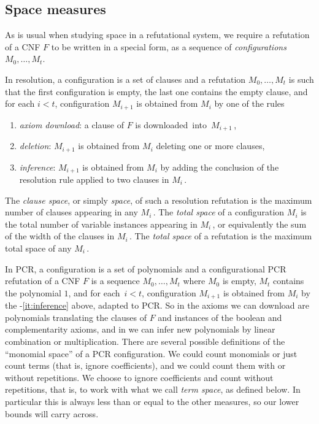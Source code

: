 \documentclass{toc}
\begin{document}
\subsection{Space measures} \label{sec:space_intro}
As is usual when studying space in a refutational system, we require a  refutation of a CNF $F$  to be 
written in a special form, as 
a sequence of \emph{configurations}  $M_0, \dots, M_t$. 

In resolution, a configuration is a set of clauses and a refutation  $M_0, \dots, M_t$ is such that the first configuration is empty, the last one contains the empty clause,
 and for each $i<t$, configuration 
 $M_{i+1}$ is obtained from $M_{i}$ by one of the rules
\begin{enumerate}[(1)]
\item\label{it:axiom-download}
\emph{axiom download}: a clause of $F$  is downloaded~into~$M_{i+1}$\,,
\item
\emph{deletion}: $M_{i+1}$ is obtained from $M_i$ deleting one or more clauses, 
\item\label{it:inference}
\emph{inference}:  $M_{i+1}$ is obtained from $M_i$ by adding the conclusion of  the  resolution rule applied to two clauses in $M_i$\,.
\end{enumerate}

\begin{definition}
The \emph{clause space}, or simply \emph{space}, of such a resolution refutation
is the maximum number of clauses appearing in any $M_i$\,.
The \emph{total space} of a configuration $M_i$ is the total number of variable instances appearing in $M_i$\,,
or equivalently the sum of the width of the clauses in $M_i$\,. The \emph{total space} of a refutation 
is the maximum total space of any $M_i$\,.
\end{definition}

In PCR, a configuration is a set of polynomials and a configurational PCR refutation of a CNF $F$ is a sequence 
$M_0, \dots, M_t$ where $M_0$ is empty, $M_t$ contains the polynomial $1$, and for each~$i<t$,
configuration 
$M_{i+1}$ is obtained from $M_i$ by
the -\ref{it:inference} above, adapted to PCR.
So in  
the axioms we can download
 are polynomials translating the clauses of $F$ and instances of the boolean and complementarity axioms,
 and in  we can infer new polynomials by linear combination or multiplication.
 There are several possible definitions of the ``monomial space'' of a PCR configuration. 
We could count monomials or just count terms (that is, ignore coefficients),
 and we could count them with or without repetitions.
We choose to ignore coefficients and count without repetitions,
that is, to work with what we call \emph{term space}, as defined below. In
particular this is always less than or equal to the other measures, so our lower bounds will carry across.
\end{document}
